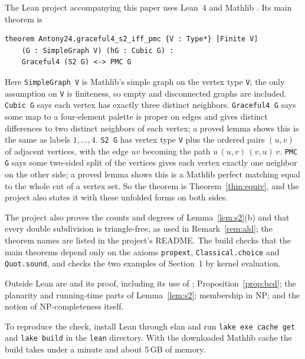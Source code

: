 \documentclass[11pt]{article}
\theoremstyle{remark}
\begin{document}
The Lean project accompanying this paper uses Lean~4 \cite{Lean} and Mathlib
\cite{Mathlib}. Its main theorem is
\begin{verbatim}
theorem Antony24.graceful4_s2_iff_pmc {V : Type*} [Finite V]
    (G : SimpleGraph V) (hG : Cubic G) :
    Graceful4 (S2 G) <-> PMC G
\end{verbatim}
Here \texttt{SimpleGraph V} is Mathlib's simple graph on the vertex type
\texttt{V}; the only assumption on \texttt{V} is finiteness, so empty and
disconnected graphs are included. \texttt{Cubic G} says each vertex has exactly
three distinct neighbors. \texttt{Graceful4 G} says some map to a four-element
palette is proper on edges and gives distinct differences to two distinct
neighbors of each vertex; a proved lemma shows this is the same as labels
$1,\dots,4$. \texttt{S2 G} has vertex type \texttt{V} plus the ordered pairs
$(u,v)$ of adjacent vertices, with the edge $uv$ becoming the path
$u\,(u,v)\,(v,u)\,v$. \texttt{PMC G} says some two-sided split of the vertices
gives each vertex exactly one neighbor on the other side; a proved lemma shows
this is a Mathlib perfect matching equal to the whole cut of a vertex set. So
the theorem is Theorem~\ref{thm:equiv}, and the project also states it with
these unfolded forms on both sides.

The project also proves the counts and degrees of Lemma~\ref{lem:s2}(b) and
that every double subdivision is triangle-free, as used in
Remark~\ref{rem:ald}; the theorem names are listed in the project's README.
The build checks that the main theorems depend only on the axioms
\texttt{propext}, \texttt{Classical.choice} and \texttt{Quot.sound}, and
checks the two examples of Section~1 by kernel evaluation.

Outside Lean are \cite[Theorem~1]{BCD} and its proof, including its use of
\cite{DD}; Proposition~\ref{prop:bcd}; the planarity and running-time parts of
Lemma~\ref{lem:s2}; membership in NP; and the notion of NP-completeness
itself.

To reproduce the check, install Lean through elan and run
\texttt{lake exe cache get} and \texttt{lake build} in the \texttt{lean}
directory. With the downloaded Mathlib cache the build takes under a minute and
about 5\,GB of memory.
\end{document}

